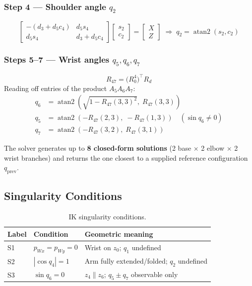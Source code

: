 \documentclass[11pt,a4paper]{article}
\begin{document}
\subsubsection*{Step 4 — Shoulder angle $q_2$}
\begin{equation}
  \begin{bmatrix}-(d_3+d_5c_4)&d_5s_4\\d_5s_4&d_3+d_5c_4\end{bmatrix}
  \begin{bmatrix}s_2\\c_2\end{bmatrix}=\begin{bmatrix}X\\Z\end{bmatrix}
  \;\Rightarrow\; q_2 = \operatorname{atan2}(s_2,c_2)
\end{equation}

\subsubsection*{Steps 5--7 — Wrist angles $q_5,q_6,q_7$}
\begin{equation}
  R_{47}=\bigl(R_0^4\bigr)^\top R_d
\end{equation}
Reading off entries of the product $A_5A_6A_7$:
\begin{align}
  q_6 &= \operatorname{atan2}\!\left(\sqrt{1-R_{47}(3,3)^2},\;R_{47}(3,3)\right)\\
  q_5 &= \operatorname{atan2}\!\left(-R_{47}(2,3),\;-R_{47}(1,3)\right)
         \quad(\sin q_6\neq 0)\\
  q_7 &= \operatorname{atan2}\!\left(-R_{47}(3,2),\;R_{47}(3,1)\right)
\end{align}

The solver generates up to \textbf{8 closed-form solutions}
(2 base $\times$ 2 elbow $\times$ 2 wrist branches) and returns the one
closest to a supplied reference configuration $q_{\mathrm{prev}}$.

\subsection{Singularity Conditions}
\begin{table}[H]
  \centering
  \caption{IK singularity conditions.}
  \begin{tabular}{lll}
    \toprule
    Label & Condition & Geometric meaning \\
    \midrule
    S1 & $p_{Wx}=p_{Wy}=0$ & Wrist on $z_0$; $q_1$ undefined \\
    S2 & $|\cos q_4|=1$    & Arm fully extended/folded; $q_2$ undefined \\
    S3 & $\sin q_6=0$      & $z_4\parallel z_6$; $q_5\pm q_7$ observable only \\
    \bottomrule
  \end{tabular}
\end{table}
\end{document}

